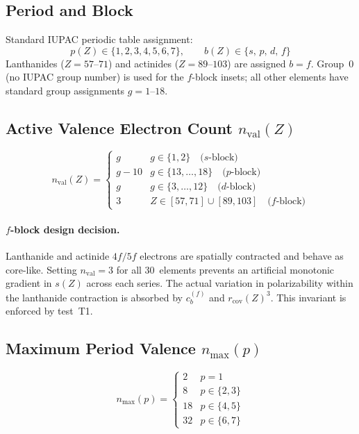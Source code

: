 \documentclass[11pt,letterpaper]{article}
\newcommand{\rcov}{r_{\mathrm{cov}}}
\newcommand{\nval}{n_{\mathrm{val}}}
\newcommand{\nmax}{n_{\mathrm{max}}}
\newcommand{\cb}{c_b}
\begin{document}
\subsection{Period and Block}

Standard IUPAC periodic table assignment:
\[
p(Z) \in \{1,2,3,4,5,6,7\}, \qquad
b(Z) \in \{s,\,p,\,d,\,f\}
\]
Lanthanides ($Z=57$--$71$) and actinides ($Z=89$--$103$) are assigned
$b = f$.  Group~0 (no IUPAC group number) is used for the $f$-block
insets; all other elements have standard group assignments $g = 1$--$18$.

\subsection{Active Valence Electron Count $\nval(Z)$}
\label{sec:nval}

\begin{equation}
\nval(Z) = \begin{cases}
  g           & g \in \{1,2\} \quad \text{($s$-block)} \\
  g - 10      & g \in \{13,\ldots,18\} \quad \text{($p$-block)} \\
  g           & g \in \{3,\ldots,12\} \quad \text{($d$-block)} \\
  3           & Z \in [57,71] \cup [89,103] \quad \text{($f$-block)}
\end{cases}
\label{eq:nval}
\end{equation}

\paragraph{$f$-block design decision.}
Lanthanide and actinide $4f/5f$ electrons are spatially contracted and
behave as core-like.  Setting $\nval = 3$ for all 30~elements prevents an
artificial monotonic gradient in $s(Z)$ across each series.  The actual
variation in polarizability within the lanthanide contraction is absorbed
by $\cb^{(f)}$ and $\rcov(Z)^3$.  This invariant is enforced by test~T1.

\subsection{Maximum Period Valence $\nmax(p)$}

\begin{equation}
\nmax(p) = \begin{cases}
  2  & p = 1 \\
  8  & p \in \{2,3\} \\
  18 & p \in \{4,5\} \\
  32 & p \in \{6,7\}
\end{cases}
\end{equation}
\end{document}
